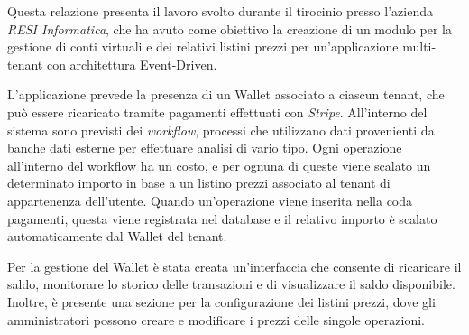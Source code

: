 Questa relazione presenta il lavoro svolto durante il tirocinio presso l'azienda \textit{RESI Informatica}, che ha avuto come obiettivo la creazione di un modulo per la
gestione di conti virtuali e dei relativi listini prezzi per un'applicazione multi-tenant con architettura Event-Driven.

L'applicazione prevede la presenza di un Wallet associato a ciascun tenant, che pu\`o essere ricaricato tramite pagamenti effettuati con \textit{Stripe}.
All'interno del sistema sono previsti dei \textit{workflow}, processi che utilizzano dati provenienti da banche dati esterne per effettuare analisi di vario tipo.
Ogni operazione all'interno del workflow ha un costo, e per ognuna di queste viene scalato un determinato importo in base a un listino prezzi associato al tenant di appartenenza dell'utente.
Quando un'operazione viene inserita nella coda pagamenti, questa viene registrata nel database e il relativo importo \`e scalato automaticamente dal Wallet del tenant.

Per la gestione del Wallet \`e stata creata un'interfaccia che consente di ricaricare il saldo, monitorare lo storico delle transazioni e di visualizzare il saldo disponibile.
Inoltre, \`e presente una sezione per la configurazione dei listini prezzi, dove gli amministratori possono creare e modificare i prezzi delle singole operazioni.
